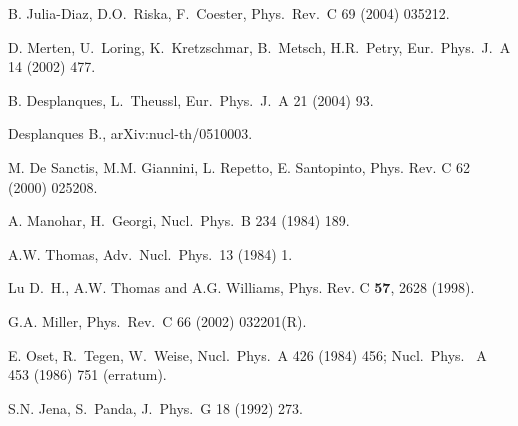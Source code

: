 \begin{thebibliography}{PPV06}
  B. Julia-Diaz, D.O.~Riska, F.~Coester,
  Phys.\ Rev.\ C  69 (2004) 035212. 

  D. Merten, U.~Loring, K.~Kretzschmar, B.~Metsch, H.R.~Petry,
  Eur.\ Phys.\ J.\ A  14 (2002) 477.

  B. Desplanques, L.~Theussl,
  Eur.\ Phys.\ J.\ A  21 (2004) 93.

  Desplanques B.,
  arXiv:nucl-th/0510003.

M. De Sanctis, M.M. Giannini, L. Repetto, E. Santopinto,
Phys. Rev. C  62 (2000) 025208.

  A. Manohar, H.~Georgi,
  Nucl.\ Phys.\  B  234 (1984) 189.

  A.W. Thomas,
  Adv.\ Nucl.\ Phys.\   13 (1984) 1.

Lu D.~H., A.W. Thomas and A.G. Williams, Phys. Rev. C {\bf 57}, 2628 (1998).

  G.A. Miller,
  Phys.\ Rev.\ C  66 (2002) 032201(R).

  E. Oset, R.~Tegen, W.~Weise,
  Nucl.\ Phys.\  A  426 (1984) 456; Nucl.\ Phys. \  A  453 (1986) 751 (erratum).

  S.N. Jena, S.~Panda,
  J.\ Phys.\ G  18 (1992) 273.


\end{thebibliography}
